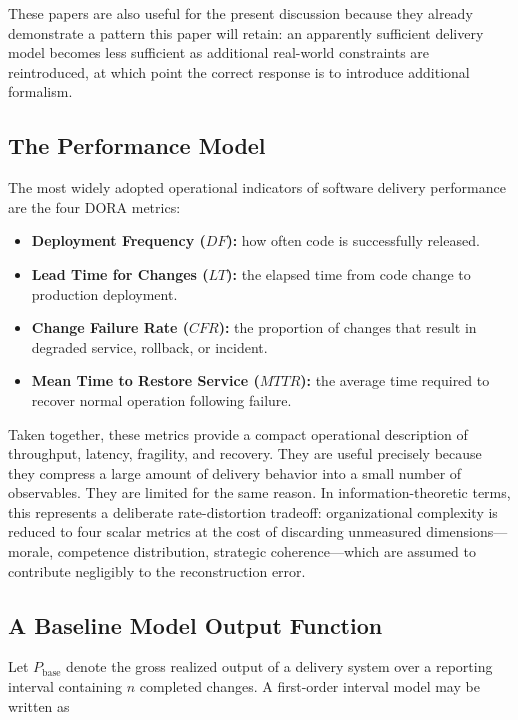 \documentclass[letterpaper]{article}
\begin{document}
These papers are also useful for the present discussion because they already demonstrate a pattern this paper will retain: an apparently sufficient delivery model becomes less sufficient as additional real-world constraints are reintroduced, at which point the correct response is to introduce additional formalism.


\subsection{The Performance Model}

The most widely adopted operational indicators of software delivery performance are the four DORA metrics:

\begin{itemize}
    \item \textbf{Deployment Frequency ($DF$):} how often code is successfully released.
    \item \textbf{Lead Time for Changes ($LT$):} the elapsed time from code change to production deployment.
    \item \textbf{Change Failure Rate ($CFR$):} the proportion of changes that result in degraded service, rollback, or incident.
    \item \textbf{Mean Time to Restore Service ($MTTR$):} the average time required to recover normal operation following failure.
\end{itemize}

Taken together, these metrics provide a compact operational description of throughput, latency, fragility, and recovery. 
They are useful precisely because they compress a large amount of delivery behavior into a small number of observables. They are limited for the same reason. In information-theoretic terms, this represents a deliberate rate-distortion tradeoff: organizational complexity is reduced to four scalar metrics at the cost of discarding unmeasured dimensions—morale, competence distribution, strategic coherence---which are assumed to contribute negligibly to the reconstruction error.

\subsection{A Baseline Model Output Function}

Let $P_{\mathrm{base}}$ denote the gross realized output of a delivery system over a reporting interval containing $n$ completed changes. A first-order interval model may be written as
\end{document}
